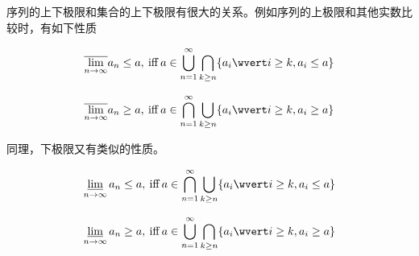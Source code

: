 序列的上下极限和集合的上下极限有很大的关系。例如序列的上极限和其他实数比较时，有如下性质

\[
\overline{\lim_{n \to \infty}} a_n \le a ,\:\text{iff}\: a \in \bigcup_{n=1}^{\infty} \bigcap_{k \ge n} \{ a_i \wvert i \ge k, a_i \le a \} 
\]


\[
\overline{\lim_{n \to \infty}} a_n \ge a ,\:\text{iff}\: a \in \bigcap_{n=1}^{\infty} \bigcup_{k \ge n} \{ a_i \wvert i \ge k, a_i \ge a \} 
\]

同理，下极限又有类似的性质。

\[
\varliminf_{n \to \infty} a_n \le a ,\:\text{iff}\: a \in \bigcap_{n=1}^{\infty} \bigcup_{k \ge n} \{ a_i \wvert i \ge k, a_i \le a \} 
\]


\[
\varliminf_{n \to \infty} a_n \ge a ,\:\text{iff}\: a \in \bigcup_{n=1}^{\infty} \bigcap_{k \ge n} \{ a_i \wvert i \ge k, a_i \ge a \} 
\]
